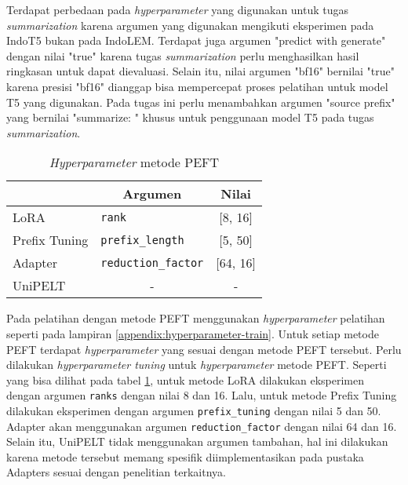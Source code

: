 Terdapat perbedaan pada \textit{hyperparameter} yang digunakan untuk tugas \textit{summarization} karena argumen yang digunakan mengikuti eksperimen pada IndoT5 bukan pada IndoLEM. Terdapat juga argumen "predict with generate" dengan nilai "true" karena tugas \textit{summarization} perlu menghasilkan hasil ringkasan untuk dapat dievaluasi. Selain itu, nilai argumen "bf16" bernilai "true" karena presisi "bf16" dianggap bisa mempercepat proses pelatihan untuk model T5 yang digunakan. Pada tugas ini perlu menambahkan argumen "source prefix" yang bernilai "summarize: " khusus untuk penggunaan model T5 pada tugas \textit{summarization}.

\begin{table}[h]
    \centering
    \caption{\textit{Hyperparameter} metode PEFT}
    \label{table:hyperparameter-PEFT}
    \begin{tabular}{|l|l|c|}
        \hline \rowcolor{black!10}
        \multicolumn{1}{|c|}{\textbf{Metode}} & \multicolumn{1}{|c|}{\textbf{Argumen}} & \textbf{Nilai} \\ \hline
        LoRA & \texttt{rank} & [8, 16] \\ \hline
        Prefix Tuning & \texttt{prefix\_length} & [5, 50] \\ \hline
        Adapter & \texttt{reduction\_factor} & [64, 16] \\ \hline
        UniPELT & \multicolumn{1}{|c|}{-}  & - \\ \hline
    \end{tabular}
\end{table}

Pada pelatihan dengan metode PEFT  menggunakan \textit{hyperparameter} pelatihan seperti pada lampiran \ref{appendix:hyperparameter-train}. Untuk setiap metode PEFT terdapat \textit{hyperparameter} yang sesuai dengan metode PEFT tersebut. Perlu dilakukan \textit{hyperparameter tuning} untuk \textit{hyperparameter} metode PEFT. Seperti yang bisa dilihat pada tabel \ref{table:hyperparameter-PEFT}, untuk metode LoRA dilakukan eksperimen dengan argumen \texttt{ranks} dengan nilai 8 dan 16. Lalu, untuk metode Prefix Tuning dilakukan eksperimen dengan argumen \texttt{prefix\_tuning} dengan nilai 5 dan 50. Adapter akan menggunakan argumen \texttt{reduction\_factor} dengan nilai 64 dan 16. Selain itu, UniPELT tidak menggunakan argumen tambahan, hal ini dilakukan karena metode tersebut memang spesifik diimplementasikan pada pustaka Adapters sesuai dengan penelitian terkaitnya.
